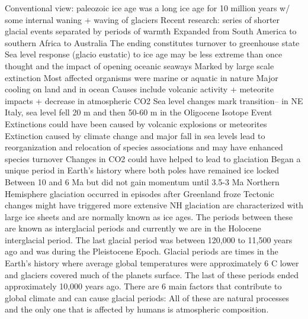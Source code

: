             \ddd Conventional view: paleozoic ice age was a long ice age for 10 million years w/ some internal waning + waving of glaciers
            \ddd Recent research: series of shorter glacial events separated by periods of warmth
            \ddd Expanded from South America to southern Africa to Australia 
            \ddd The ending constitutes turnover to greenhouse state
            \ddd Sea level response (glacio eustatic) to ice age may be less extreme than once thought
         and the impact of opening oceanic seaways
            \ddd Marked by large scale extinction
            \ddd Most affected organisms were marine or aquatic in nature
            \ddd Major cooling on land and in ocean
            \ddd Causes include volcanic activity + meteorite impacts + decrease in atmospheric CO2
            \ddd Sea level changes mark transition-- in NE Italy, sea level fell 20 m and then 50-60 m in the Oligocene Isotope Event
            \ddd Extinctions could have been caused by volcanic explosions or meteorites
            \ddd Extinction caused by climate change and major fall in sea levels
            \ddd lead to reorganization and relocation of species associations and may have enhanced species turnover
            \ddd Changes in CO2 could have helped to lead to glaciation
            \ddd Began a unique period in Earth’s history where both poles have remained ice locked
            \ddd Between 10 and 6 Ma but did not gain momentum until 3.5-3 Ma
            \ddd Northern Hemisphere glaciation occurred in episodes after Greenland froze
            \ddd Tectonic changes might have triggered more extensive NH glaciation
         are characterized with large ice sheets and are normally known as ice ages. The periods between these are known as interglacial periods and currently we are in the Holocene interglacial period. The last glacial period was between 120,000 to 11,500 years ago and was during the Pleistocene Epoch.
        \ddd Glacial periods are times in the Earth's history where average global temperatures were approximately 6 C lower and glaciers covered much of the planets surface. The last of these periods ended approximately 10,000 years ago. There are 6 main factors that contribute to global climate and can cause glacial periods:  All of these are natural processes and the only one that is affected by humans is atmospheric composition.
